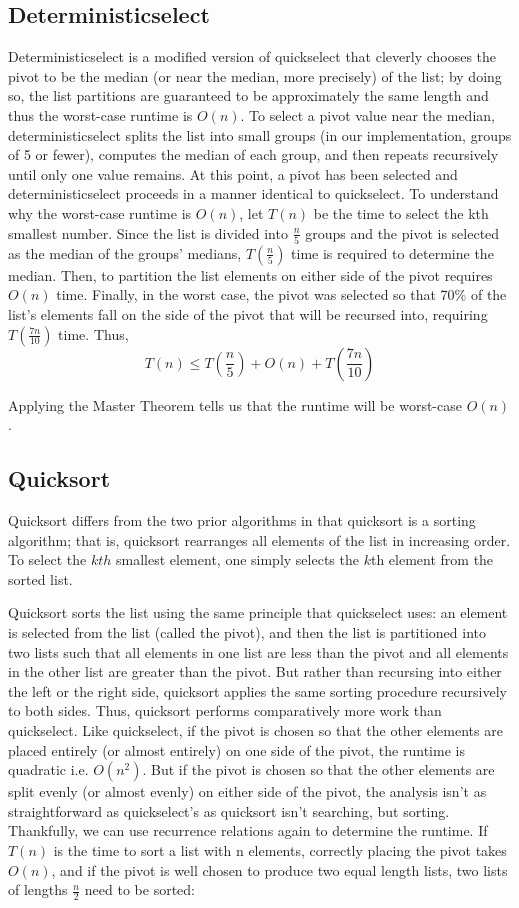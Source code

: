 \documentclass{article}
\begin{document}
\subsection*{Deterministicselect}
\indent \indent Deterministicselect is a modified version of quickselect that cleverly chooses the pivot to be the median (or near the median, more precisely) of the list; by doing so, the list partitions are guaranteed to be approximately the same length and thus the worst-case runtime is $O(n)$. To select a pivot value near the median, deterministicselect splits the list into small groups (in our implementation, groups of 5 or fewer), computes the median of each group, and then repeats recursively until only one value remains. At this point, a pivot has been selected and deterministicselect proceeds in a manner identical to quickselect. To understand why the worst-case runtime is $O(n)$, let $T(n)$ be the time to select the kth smallest number. Since the list is divided into $\frac{n}{5}$ groups and the pivot is selected as the median of the groups' medians, $T(\frac{n}{5})$ time is required to determine the median. Then, to partition the list elements on either side of the pivot requires $O(n)$ time. Finally, in the worst case, the pivot was selected so that 70\% of the list's elements fall on the side of the pivot that will be recursed into, requiring $T(\frac{7n}{10})$ time. Thus, $$T(n) \leq T(\frac{n}{5}) + O(n) + T(\frac{7n}{10})$$

Applying the Master Theorem tells us that the runtime will be worst-case $O(n)$.

\subsection*{Quicksort}
\indent \indent Quicksort differs from the two prior algorithms in that quicksort is a sorting algorithm; that is, quicksort rearranges all elements of the list in increasing order. To select the $kth$ smallest element, one simply selects the $k$th element from the sorted list.

Quicksort sorts the list using the same principle that quickselect uses: an element is selected from the list (called the pivot), and then the list is partitioned into two lists such that all elements in one list are less than the pivot and all elements in the other list are greater than the pivot. But rather than recursing into either the left or the right side, quicksort applies the same sorting procedure recursively to both sides. Thus, quicksort performs comparatively more work than quickselect. Like quickselect, if the pivot is chosen so that the other elements are placed entirely (or almost entirely) on one side of the pivot, the runtime is quadratic i.e. $O(n^2)$. But if the pivot is chosen so that the other elements are split evenly (or almost evenly) on either side of the pivot, the analysis isn't as straightforward as quickselect's as quicksort isn't searching, but sorting. Thankfully, we can use recurrence relations again to determine the runtime. If $T(n)$ is the time to sort a list with n elements, correctly placing the pivot takes $O(n)$, and if the pivot is well chosen to produce two equal length lists, two lists of lengths $\frac{n}{2}$ need to be sorted:
\end{document}
